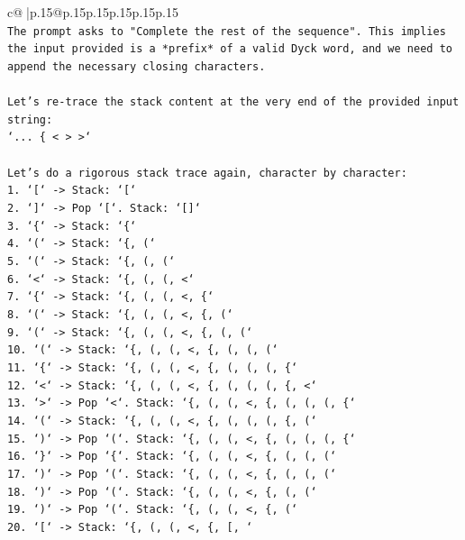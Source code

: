\documentclass{article}
\begin{document}
{\begin{supertabular}{c@{$\;$}|p{.15\linewidth}@{}p{.15\linewidth}p{.15\linewidth}p{.15\linewidth}p{.15\linewidth}p{.15\linewidth}}
{{{\\ 
\texttt{The prompt asks to "Complete the rest of the sequence". This implies the input provided is a *prefix* of a valid Dyck word, and we need to append the necessary closing characters.} \\
\\ 
\texttt{Let's re{-}trace the stack content at the very end of the provided input string:} \\
\texttt{`... \{ < > >`} \\
\\ 
\texttt{Let's do a rigorous stack trace again, character by character:} \\
\texttt{1. `{[}` {-}> Stack: `{[}`} \\
\texttt{2. `{]}` {-}> Pop `{[}`. Stack: `{[}{]}`} \\
\texttt{3. `\{` {-}> Stack: `\{`} \\
\texttt{4. `(` {-}> Stack: `\{, (`} \\
\texttt{5. `(` {-}> Stack: `\{, (, (`} \\
\texttt{6. `<` {-}> Stack: `\{, (, (, <`} \\
\texttt{7. `\{` {-}> Stack: `\{, (, (, <, \{`} \\
\texttt{8. `(` {-}> Stack: `\{, (, (, <, \{, (`} \\
\texttt{9. `(` {-}> Stack: `\{, (, (, <, \{, (, (`} \\
\texttt{10. `(` {-}> Stack: `\{, (, (, <, \{, (, (, (`} \\
\texttt{11. `\{` {-}> Stack: `\{, (, (, <, \{, (, (, (, \{`} \\
\texttt{12. `<` {-}> Stack: `\{, (, (, <, \{, (, (, (, \{, <`} \\
\texttt{13. `>` {-}> Pop `<`. Stack: `\{, (, (, <, \{, (, (, (, \{`} \\
\texttt{14. `(` {-}> Stack: `\{, (, (, <, \{, (, (, (, \{, (`} \\
\texttt{15. `)` {-}> Pop `(`. Stack: `\{, (, (, <, \{, (, (, (, \{`} \\
\texttt{16. `\}` {-}> Pop `\{`. Stack: `\{, (, (, <, \{, (, (, (`} \\
\texttt{17. `)` {-}> Pop `(`. Stack: `\{, (, (, <, \{, (, (, (`} \\
\texttt{18. `)` {-}> Pop `(`. Stack: `\{, (, (, <, \{, (, (`} \\
\texttt{19. `)` {-}> Pop `(`. Stack: `\{, (, (, <, \{, (`} \\
\texttt{20. `{[}` {-}> Stack: `\{, (, (, <, \{, {[}, `} \\
}}}
\end{supertabular}}
\end{document}
